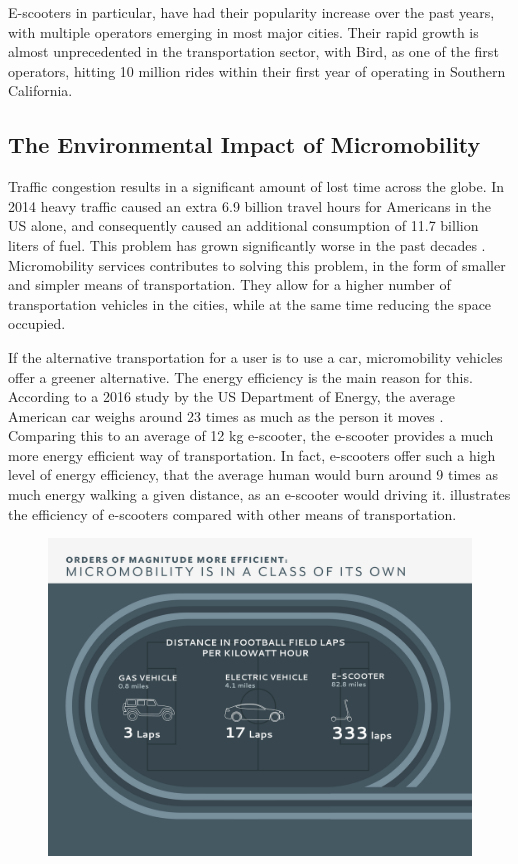 E-scooters in particular, have had their popularity increase over the past years, with multiple operators emerging in most major cities. Their rapid growth is almost unprecedented in the transportation sector, with Bird, as one of the first operators, hitting 10 million rides within their first year of operating in Southern California. 

\subsection{The Environmental Impact of Micromobility}\label{impact}
Traffic congestion results in a significant amount of lost time across the globe. In 2014 heavy traffic caused an extra 6.9 billion travel hours for Americans in the US alone, and consequently caused an additional consumption of 11.7 billion liters of fuel. This problem has grown significantly worse in the past decades \citep{bopp_bicycling_2018}. Micromobility services contributes to solving this problem, in the form of smaller and simpler means of transportation. They allow for a higher number of transportation vehicles in the cities, while at the same time reducing the space occupied. 

 If the alternative transportation for a user is to use a car, micromobility vehicles offer a greener alternative.  The energy efficiency is the main reason for this.  According to a 2016 study  by  the  US  Department  of  Energy,  the  average  American  car  weighs  around  23  times  as much  as  the  person  it  moves \citep{tillemann_forget_2018}.   Comparing  this  to  an  average of 12  kg  e-scooter, the e-scooter  provides  a  much  more  energy  efficient  way of transportation.  In fact, e-scooters offer such a high level of energy efficiency, that the average human would burn around 9 times as much energy walking a given distance, as an e-scooter would driving it.  illustrates the efficiency of e-scooters compared with other means of transportation.
\\
\begin{figure}[H]
    \centering
    \includegraphics[width=0.8\columnwidth]{Images/footballfields.png}
    \label{fig:magnitude of efficiency}
\end{figure}

